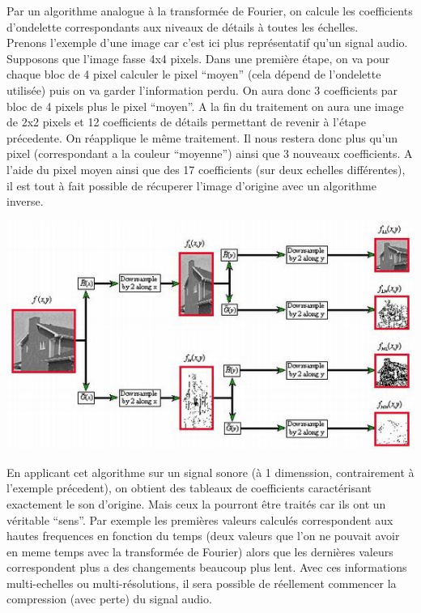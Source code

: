 \documentclass[a4paper,12pt]{article}
\begin{document}
Par un algorithme analogue à la transformée de Fourier, on calcule les
coefficients d'ondelette correspondants aux niveaux de détails à toutes les
échelles.\\
Prenons l'exemple d'une image car c'est ici plus représentatif qu'un signal
audio. Supposons que l'image fasse 4x4 pixels. Dans une première étape, on va
pour chaque bloc de 4 pixel calculer le pixel ``moyen'' (cela dépend de
l'ondelette utilisée) puis on va garder l'information perdu. On aura donc 3
coefficients par bloc de 4 pixels plus le pixel ``moyen''. A la fin du
traitement on aura une image de 2x2 pixels et 12 coefficients de détails
permettant de revenir à l'étape précedente. On réapplique le même traitement. Il
nous restera donc plus qu'un pixel (correspondant a la couleur ``moyenne'')
ainsi que 3 nouveaux coefficients. A l'aide du pixel moyen ainsi que des 17
coefficients (sur deux echelles différentes), il est tout à fait possible de
récuperer l'image d'origine avec un algorithme inverse.
\begin{center}
\includegraphics[scale=0.50]{img/ondelettes.jpg}
\end{center}
En applicant cet algorithme sur un signal sonore (à 1 dimenssion,
contrairement à l'exemple précedent), on obtient des tableaux de
coefficients caractérisant exactement le son d'origine. Mais ceux la
pourront être traités car ils ont un véritable ``sens''. Par exemple
les premi\`eres valeurs calculés correspondent aux hautes frequences en
fonction du temps (deux valeurs que l'on ne pouvait avoir en meme
temps avec la transformée de Fourier) alors que les derni\`eres valeurs
correspondent plus a des changements beaucoup plus lent. Avec ces
informations multi-echelles ou multi-résolutions, il sera possible de
réellement commencer la compression (avec perte) du signal audio.
\end{document}
